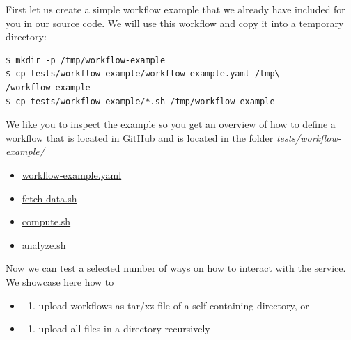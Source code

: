 First let us create a simple workflow example that we already have
included for you in our source code. We will use this workflow and copy
it into a temporary directory:

\smallskip
\begin{verbatim}
$ mkdir -p /tmp/workflow-example
$ cp tests/workflow-example/workflow-example.yaml /tmp\
/workflow-example
$ cp tests/workflow-example/*.sh /tmp/workflow-example
\end{verbatim}
\smallskip


We like you to inspect the example so you get an overview of how to
define a workflow that is located in
\href{https://github.com/cloudmesh/cloudmesh-cc/tree/main/tests/workflow-example}{GitHub} and is located in the folder \emph{tests/workflow-example/}

\begin{itemize}
\item
  \href{https://github.com/cloudmesh/cloudmesh-cc/blob/main/tests/workflow-example/workflow-example.yaml}{workflow-example.yaml}
\item
  \href{https://github.com/cloudmesh/cloudmesh-cc/blob/main/tests/workflow-example/fetch-data.sh}{fetch-data.sh}
\item
  \href{https://github.com/cloudmesh/cloudmesh-cc/blob/main/tests/workflow-example/compute.sh}{compute.sh}
\item
  \href{https://github.com/cloudmesh/cloudmesh-cc/blob/main/tests/workflow-example/analyze.sh}{analyze.sh}
\end{itemize}

Now we can test a selected number of ways on how to interact with the
service. We showcase here how to

\begin{itemize}
\item
  \begin{enumerate}
  \def\labelenumi{\Alph{enumi}.}
  \item
    upload workflows as tar/xz file of a self containing directory, or
  \end{enumerate}
\item
  \begin{enumerate}
  \def\labelenumi{\Alph{enumi}.}
  \setcounter{enumi}{1}
  \item
    upload all files in a directory recursively
  \end{enumerate}
\end{itemize}

